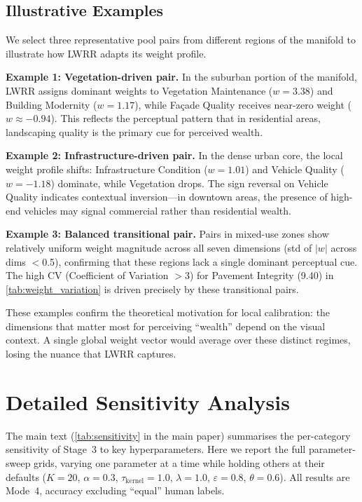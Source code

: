 \documentclass[runningheads]{llncs}
\begin{document}
\subsection{Illustrative Examples}

We select three representative pool pairs from different regions of the manifold to illustrate how LWRR adapts its weight profile.

\medskip\noindent\textbf{Example 1: Vegetation-driven pair.}
In the suburban portion of the manifold, LWRR assigns dominant weights to Vegetation Maintenance ($w{=}3.38$) and Building Modernity ($w{=}1.17$), while Fa\c{c}ade Quality receives near-zero weight ($w{\approx}-0.94$).
This reflects the perceptual pattern that in residential areas, landscaping quality is the primary cue for perceived wealth.

\medskip\noindent\textbf{Example 2: Infrastructure-driven pair.}
In the dense urban core, the local weight profile shifts: Infrastructure Condition ($w{=}1.01$) and Vehicle Quality ($w{=}-1.18$) dominate, while Vegetation drops.
The sign reversal on Vehicle Quality indicates contextual inversion---in downtown areas, the presence of high-end vehicles may signal commercial rather than residential wealth.

\medskip\noindent\textbf{Example 3: Balanced transitional pair.}
Pairs in mixed-use zones show relatively uniform weight magnitude across all seven dimensions (std of $|w|$ across dims $<$0.5), confirming that these regions lack a single dominant perceptual cue.
The high CV (Coefficient of Variation $>$3) for Pavement Integrity (9.40) in \cref{tab:weight_variation} is driven precisely by these transitional pairs.

\medskip
These examples confirm the theoretical motivation for local calibration: the dimensions that matter most for perceiving ``wealth'' depend on the visual context.
A single global weight vector would average over these distinct regimes, losing the nuance that LWRR captures.


\section{Detailed Sensitivity Analysis}
\label{sec:sensitivity_full}

The main text (\cref{tab:sensitivity} in the main paper) summarises the per-category sensitivity of Stage~3 to key hyperparameters.
Here we report the full parameter-sweep grids, varying one parameter at a time while holding others at their defaults ($K{=}20$, $\alpha{=}0.3$, $\tau_{\mathrm{kernel}}{=}1.0$, $\lambda{=}1.0$, $\varepsilon{=}0.8$, $\theta{=}0.6$).
All results are Mode~4, accuracy excluding ``equal'' human labels.
\end{document}

